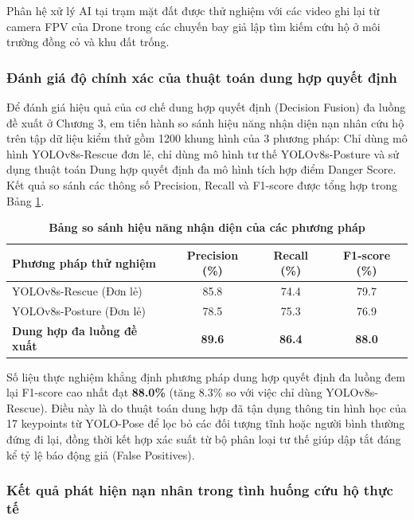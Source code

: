 Phân hệ xử lý AI tại trạm mặt đất được thử nghiệm với các video ghi lại từ camera FPV của Drone trong các chuyến bay giả lập tìm kiếm cứu hộ ở môi trường đồng cỏ và khu đất trống.

\subsubsection{Đánh giá độ chính xác của thuật toán dung hợp quyết định}

Để đánh giá hiệu quả của cơ chế dung hợp quyết định (Decision Fusion) đa luồng đề xuất ở Chương 3, em tiến hành so sánh hiệu năng nhận diện nạn nhân cứu hộ trên tập dữ liệu kiểm thử gồm 1200 khung hình của 3 phương pháp: Chỉ dùng mô hình YOLOv8s-Rescue đơn lẻ, chỉ dùng mô hình tư thế YOLOv8s-Posture và sử dụng thuật toán Dung hợp quyết định đa mô hình tích hợp điểm Danger Score. Kết quả so sánh các thông số Precision, Recall và F1-score được tổng hợp trong Bảng \ref{tab:comparison_ai}.

\begin{table}[H]
    \centering
    \caption[Bảng so sánh hiệu năng nhận diện của các phương pháp]{\bfseries\fontsize{12pt}{0pt}\selectfont Bảng so sánh hiệu năng nhận diện của các phương pháp}
    \begin{tabularx}{\textwidth}{|X|c|c|c|}
    \hline
    \rowcolor{LightCyan}
    \textbf{Phương pháp thử nghiệm} & \textbf{Precision (\%)} & \textbf{Recall (\%)} & \textbf{F1-score (\%)} \\ \hline
    YOLOv8s-Rescue (Đơn lẻ) & 85.8 & 74.4 & 79.7 \\ \hline
    YOLOv8s-Posture (Đơn lẻ) & 78.5 & 75.3 & 76.9 \\ \hline
    \textbf{Dung hợp đa luồng đề xuất} & \textbf{89.6} & \textbf{86.4} & \textbf{88.0} \\ \hline
    \end{tabularx}
    \label{tab:comparison_ai}
\end{table}

Số liệu thực nghiệm khẳng định phương pháp dung hợp quyết định đa luồng đem lại F1-score cao nhất đạt \textbf{88.0\%} (tăng 8.3\% so với việc chỉ dùng YOLOv8s-Rescue). Điều này là do thuật toán dung hợp đã tận dụng thông tin hình học của 17 keypoints từ YOLO-Pose để lọc bỏ các đối tượng tĩnh hoặc người bình thường đứng đi lại, đồng thời kết hợp xác suất từ bộ phân loại tư thế giúp dập tắt đáng kể tỷ lệ báo động giả (False Positives).

\subsubsection{Kết quả phát hiện nạn nhân trong tình huống cứu hộ thực tế}

